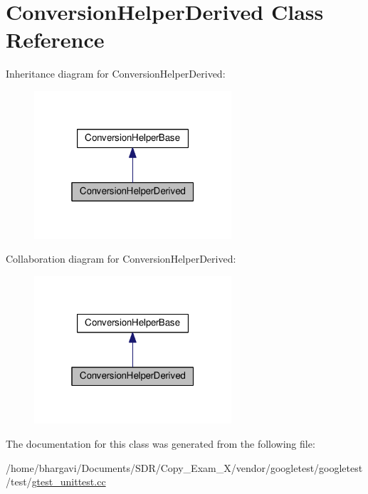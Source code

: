 \hypertarget{class_conversion_helper_derived}{}\section{Conversion\+Helper\+Derived Class Reference}
\label{class_conversion_helper_derived}


Inheritance diagram for Conversion\+Helper\+Derived\+:
\nopagebreak
\begin{figure}[H]
\begin{center}
\leavevmode
\includegraphics[width=208pt]{class_conversion_helper_derived__inherit__graph}
\end{center}
\end{figure}


Collaboration diagram for Conversion\+Helper\+Derived\+:
\nopagebreak
\begin{figure}[H]
\begin{center}
\leavevmode
\includegraphics[width=208pt]{class_conversion_helper_derived__coll__graph}
\end{center}
\end{figure}


The documentation for this class was generated from the following file\+:\begin{DoxyCompactItemize}
\item 
/home/bhargavi/\+Documents/\+S\+D\+R/\+Copy\+\_\+\+Exam\+\_\+X/vendor/googletest/googletest/test/\hyperlink{gtest__unittest_8cc}{gtest\+\_\+unittest.\+cc}\end{DoxyCompactItemize}
